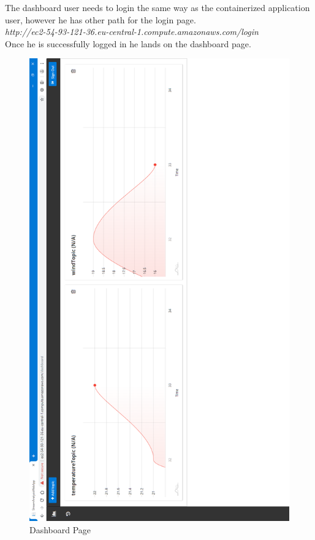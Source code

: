 The dashboard user needs to login the same way as the containerized application user, however he has other path for the login page.\\

\textit{http://ec2-54-93-121-36.eu-central-1.compute.amazonaws.com/login}\\

Once he is successfully logged in he lands on the dashboard page.

\begin{figure}[p]
	\centering
	\noindent
	\includegraphics[width=0.5\paperwidth]{./images/guide/dashboard/dashboard.PNG}
	\caption{Dashboard Page}
	\label{fig:dashboard}
\end{figure}

